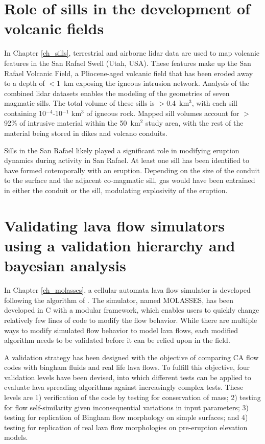 \section{Role of sills in the development of volcanic fields}
In Chapter \ref{ch_sills}, terrestrial and airborne lidar data are used to map volcanic features in the San Rafael Swell (Utah, USA). These features make up the San Rafael Volcanic Field, a Pliocene-aged volcanic field that has been eroded away to a depth of $<$1~km exposing the igneous intrusion network. Analysis of the combined lidar datasets enables the modeling of the geometries of seven magmatic sills. The total volume of these sills is $>$0.4~km$^3$, with each sill containing 10$^{-4}$-10$^{-1}$ km$^3$ of igneous rock. Mapped sill volumes account for $>$92\% of intrusive material within the 50~km$^2$ study area, with the rest of the material being stored in dikes and volcano conduits.

Sills in the San Rafael likely played a significant role in modifying eruption dynamics during activity in San Rafael. At least one sill has been identified to have formed cotemporally with an eruption. Depending on the size of the conduit to the surface and the adjacent co-magmatic sill, gas would have been entrained in either the conduit or the sill, modulating explosivity of the eruption.

\section{Validating lava flow simulators using a validation hierarchy and bayesian analysis}
In Chapter \ref{ch_molasses}, a cellular automata \citep{wolfram1984cellular} lava flow simulator is developed following the algorithm of \citet{connor2012probabilistic}. The simulator, named MOLASSES, has been developed in C with a modular framework, which enables users to quickly change relatively few lines of code to modify the flow behavior. While there are multiple ways to modify simulated flow behavior to model lava flows, each modified algorithm needs to be validated before it can be relied upon in the field. 

A validation strategy has been designed with the objective of comparing CA flow codes with bingham fluids and real life lava flows. To fulfill this objective, four validation levels have been devised, into which different tests can be applied to evaluate lava spreading algorithms against increasingly complex tests. These levels are 1) verification of the code by testing for conservation of mass; 2) testing for flow self-similarity given inconsequential variations in input parameters; 3) testing for replication of Bingham flow morphology on simple surfaces; and 4) testing for replication of real lava flow morphologies on pre-eruption elevation models. 

